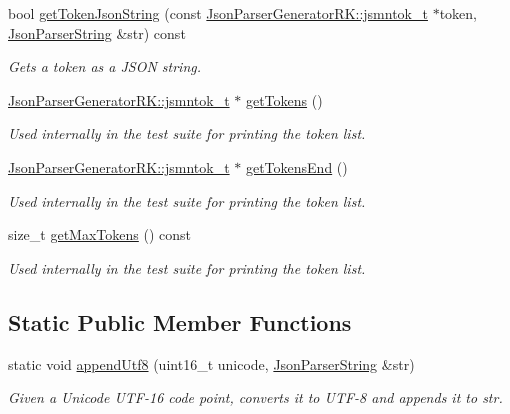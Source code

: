 \begin{DoxyCompactItemize}
bool \hyperlink{class_json_parser_a4c6d9fc64d49d057dd2b7b3ea63a7d8c}{get\+Token\+Json\+String} (const \hyperlink{struct_json_parser_generator_r_k_1_1jsmntok__t}{Json\+Parser\+Generator\+R\+K\+::jsmntok\+\_\+t} $\ast$token, \hyperlink{class_json_parser_string}{Json\+Parser\+String} \&str) const
\begin{DoxyCompactList}\small\item\em Gets a token as a J\+S\+ON string. \end{DoxyCompactList}\item 
\hyperlink{struct_json_parser_generator_r_k_1_1jsmntok__t}{Json\+Parser\+Generator\+R\+K\+::jsmntok\+\_\+t} $\ast$ \hyperlink{class_json_parser_a1cdeae1e2cf1b45cde47ca8a8f9a84c9}{get\+Tokens} ()
\begin{DoxyCompactList}\small\item\em Used internally in the test suite for printing the token list. \end{DoxyCompactList}\item 
\hyperlink{struct_json_parser_generator_r_k_1_1jsmntok__t}{Json\+Parser\+Generator\+R\+K\+::jsmntok\+\_\+t} $\ast$ \hyperlink{class_json_parser_a8e0503af76c2bc9b8d2231dddb8b1cb3}{get\+Tokens\+End} ()
\begin{DoxyCompactList}\small\item\em Used internally in the test suite for printing the token list. \end{DoxyCompactList}\item 
size\+\_\+t \hyperlink{class_json_parser_a39e91342fbbb72d6fb304dd2f2e7f505}{get\+Max\+Tokens} () const
\begin{DoxyCompactList}\small\item\em Used internally in the test suite for printing the token list. \end{DoxyCompactList}\end{DoxyCompactItemize}
\subsection*{Static Public Member Functions}
\begin{DoxyCompactItemize}
\item 
static void \hyperlink{class_json_parser_a498dcdec7949c88dfc454d052e25ff69}{append\+Utf8} (uint16\+\_\+t unicode, \hyperlink{class_json_parser_string}{Json\+Parser\+String} \&str)
\begin{DoxyCompactList}\small\item\em Given a Unicode U\+T\+F-\/16 code point, converts it to U\+T\+F-\/8 and appends it to str. \end{DoxyCompactList}\end{DoxyCompactItemize}
